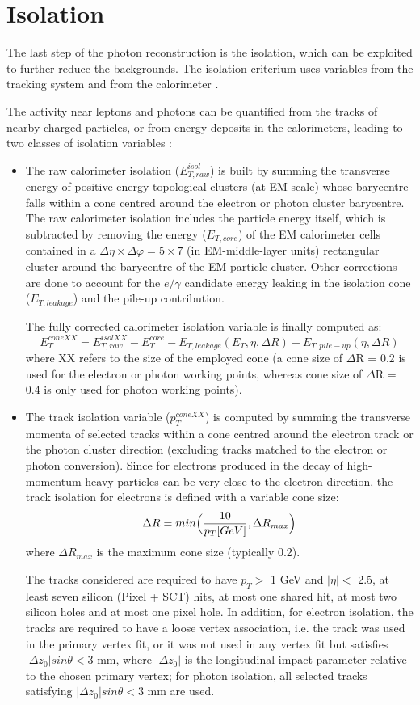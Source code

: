 \documentclass[a4paper, oneside, 11pt, openright]{book}
\begin{document}
		\section{Isolation}
			The last step of the photon reconstruction is the isolation, which can be exploited to further reduce the backgrounds. The isolation criterium uses variables from the tracking system and from the calorimeter \cite{isolation}.
			
			The activity near leptons and photons can be quantified from the tracks of nearby charged particles, or from energy deposits in the calorimeters, leading to two classes of isolation variables \cite{Aad_2019}:
			\begin{itemize}
				\item The raw calorimeter isolation ($E_{T,raw}^{isol}$) is built by summing the transverse energy of positive-energy topological clusters (at EM scale) whose barycentre falls within a cone centred around the electron or photon cluster barycentre. The raw calorimeter isolation includes the particle energy itself, which is subtracted by removing the energy ($E_{T,core}$) of the EM calorimeter cells contained in a $\Delta\eta \times \Delta\varphi = 5 \times 7$ (in EM-middle-layer units) rectangular cluster around the barycentre of the EM particle cluster. Other corrections are done to account for the $e/\gamma$ candidate energy leaking in the isolation cone ($E_{T,leakage}$) and the pile-up contribution. %
				
				The fully corrected calorimeter isolation variable is finally computed as:
				$$ 
				E_{T}^{coneXX} = E_{T,raw}^{isolXX} - E_{T}^{core} - E_{T,leakage}(E_T,\eta,\Delta R) -E_{T,pile-up}(\eta,\Delta R)
				$$
				where XX refers to the size of the employed cone (a cone size of $\Delta$R = 0.2 is used for the electron or photon working points, whereas
				cone size of $\Delta$R = 0.4 is only used for photon working points).
				\item The track isolation variable ($p_T^{coneXX}$) is computed by summing the transverse momenta of selected tracks within a cone centred around the electron track or the photon cluster direction (excluding tracks matched to the electron or photon conversion). Since for electrons produced in the decay of high-momentum heavy particles can be very close to the electron direction, the track isolation for electrons is defined with a variable cone size:
				$$
				\Delta R = min\Bigl({\frac{10}{p_T[GeV]},\Delta R_{max}}\Bigr)
				$$
				where $\Delta R_{max}$ is the maximum cone size (typically 0.2).
				
				The tracks considered are required to have $p_T >$ 1 GeV and $|\eta| <$ 2.5, at least seven silicon (Pixel + SCT) hits, at most one shared hit, at most two silicon holes and at most one pixel hole. In addition, for electron isolation, the tracks are required to have a loose vertex association, i.e. the track was used in the primary vertex fit, or it was not used in any vertex fit but satisfies $|\Delta z_0|sin{\theta} < 3$ mm, where $|\Delta z_0|$ is the longitudinal impact parameter relative to the chosen primary vertex; for photon isolation, all selected tracks satisfying $|\Delta z_0|sin{\theta} < 3$ mm are used.
			\end{itemize}
\end{document}
